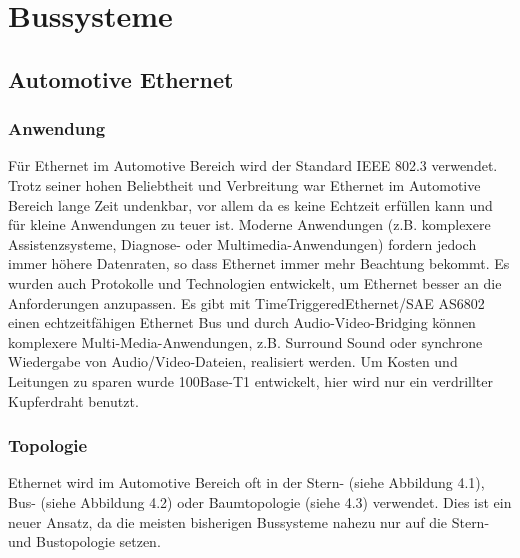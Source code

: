 \graphicspath{{./Images/Kapitel4/}}

\section{Bussysteme}

\subsection{Automotive Ethernet}
\subsubsection{Anwendung}
Für Ethernet im Automotive Bereich wird der Standard IEEE 802.3 verwendet. Trotz seiner hohen Beliebtheit und Verbreitung war Ethernet im Automotive Bereich lange Zeit undenkbar, vor allem da es keine Echtzeit erfüllen kann und für kleine Anwendungen zu teuer ist. Moderne Anwendungen (z.B. komplexere Assistenzsysteme, Diagnose- oder Multimedia-Anwendungen) fordern jedoch immer höhere Datenraten, so dass Ethernet immer mehr Beachtung bekommt. Es wurden auch Protokolle und Technologien entwickelt, um Ethernet besser an die Anforderungen anzupassen. Es gibt mit TimeTriggeredEthernet/SAE AS6802 einen echtzeitfähigen Ethernet Bus und durch Audio-Video-Bridging können komplexere Multi-Media-Anwendungen, z.B. Surround Sound oder synchrone Wiedergabe von Audio/Video-Dateien, realisiert werden. Um Kosten und Leitungen zu sparen wurde 100Base-T1 entwickelt, hier wird nur ein verdrillter Kupferdraht benutzt. \cite{.MH_Ethernet}

\subsubsection{Topologie}
Ethernet wird im Automotive Bereich oft in der Stern- (siehe Abbildung 4.1), Bus- (siehe Abbildung 4.2) oder Baumtopologie (siehe 4.3) verwendet. Dies ist ein neuer Ansatz, da die meisten bisherigen Bussysteme nahezu nur auf die Stern- und Bustopologie setzen.

\cite{.MH_Vehicle}


